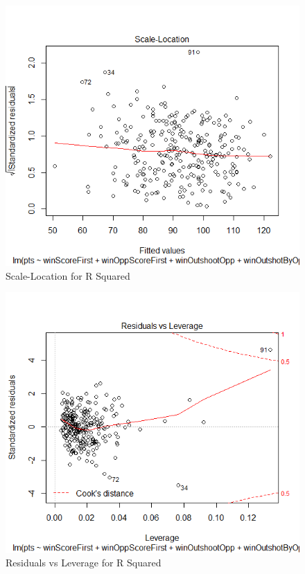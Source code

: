 \begin{figure}
	\centering
	\includegraphics[width=0.7\linewidth]{R3}
	\caption{Scale-Location for R Squared}
	\label{fig:Scale-Location for R Squared}
\end{figure}
\begin{figure}
	\centering
	\includegraphics[width=0.7\linewidth]{R4}
	\caption{Residuals vs Leverage for R Squared}
	\label{fig:Residuals vs Leverage for R Squared}
\end{figure}




